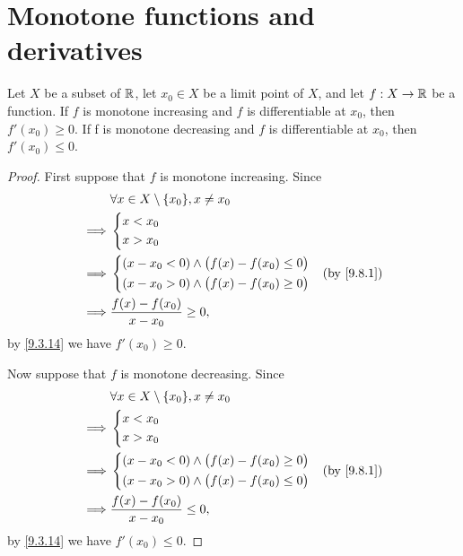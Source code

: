 \section{Monotone functions and derivatives}\label{sec:10.3}

\begin{prop}\label{10.3.1}
  Let \(X\) be a subset of \(\mathbb{R}\), let \(x_0 \in X\) be a limit point of \(X\), and let \(f : X \to \mathbb{R}\) be a function.
  If \(f\) is monotone increasing and \(f\) is differentiable at \(x_0\), then \(f'(x_0) \geq 0\).
  If f is monotone decreasing and \(f\) is differentiable at \(x_0\), then \(f'(x_0) \leq 0\).
\end{prop}

\begin{proof}
  First suppose that \(f\) is monotone increasing.
  Since
  \begin{align*}
             & \forall x \in X \setminus \{x_0\}, x \neq x_0      \\
    \implies & \begin{dcases}
                 x < x_0 \\
                 x > x_0 \\
               \end{dcases}                                      \\
    \implies & \begin{dcases}
                 (x - x_0 < 0) \land \big(f(x) - f(x_0) \leq 0\big) \\
                 (x - x_0 > 0) \land \big(f(x) - f(x_0) \geq 0\big) \\
               \end{dcases} &  & \text{(by \cref{9.8.1})} \\
    \implies & \dfrac{f(x) - f(x_0)}{x - x_0} \geq 0,
  \end{align*}
  by \cref{9.3.14} we have \(f'(x_0) \geq 0\).

  Now suppose that \(f\) is monotone decreasing.
  Since
  \begin{align*}
             & \forall x \in X \setminus \{x_0\}, x \neq x_0      \\
    \implies & \begin{dcases}
                 x < x_0 \\
                 x > x_0 \\
               \end{dcases}                                      \\
    \implies & \begin{dcases}
                 (x - x_0 < 0) \land \big(f(x) - f(x_0) \geq 0\big) \\
                 (x - x_0 > 0) \land \big(f(x) - f(x_0) \leq 0\big) \\
               \end{dcases} &  & \text{(by \cref{9.8.1})} \\
    \implies & \dfrac{f(x) - f(x_0)}{x - x_0} \leq 0,
  \end{align*}
  by \cref{9.3.14} we have \(f'(x_0) \leq 0\).
\end{proof}

